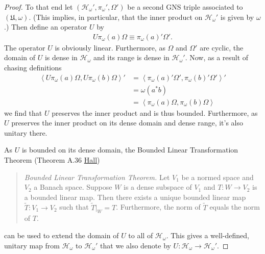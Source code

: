 \begin{proof}
To that end let $(\mathcal{H}_\omega', \pi_\omega', \Omega')$ be a second GNS triple associated to $(\mathfrak{U}, \omega)$. (This implies, in particular, that the inner product on $\mathcal{H}_\omega'$ is given by $\omega$.) Then define an operator $U$ by
\begin{align}
    U\pi_\omega(a)\Omega \equiv \pi_\omega(a)'\Omega'.
\end{align}
The operator $U$ is obviously linear. Furthermore, as $\Omega$ and $\Omega'$ are cyclic, the domain of $U$ is dense in $\mathcal{H}_\omega$ and its range is dense in $\mathcal{H}_\omega'$. Now, as a result of chasing definitions
\begin{align}
    \left< U\pi_\omega(a)\Omega, U\pi_\omega(b)\Omega \right>' &= \left<\pi_\omega(a)'\Omega', \pi_\omega(b)'\Omega'\right>' \\
                                                               &= \omega(a^*b) \\
                                                               &= \left<\pi_\omega(a)\Omega, \pi_\omega(b)\Omega\right>
\end{align}
we find that $U$ preserves the inner product and is thus bounded. Furthermore, as $U$ preserves the inner product on its dense domain and dense range, it's also unitary there.

As $U$ is bounded on its dense domain, the Bounded Linear Transformation Theorem (Theorem A.36 \href{https://doi.org/10.1007/978-1-4614-7116-5}{Hall})

\begin{quote}
    \textit{Bounded Linear Transformation Theorem.} Let $V_1$ be a normed space and $V_2$ a Banach space. Suppose $W$ is a dense subspace of $V_1$ and $T: W \rightarrow V_2$ is a bounded linear map. Then there exists a unique bounded linear map $\widetilde{T}: V_1 \rightarrow V_2$ such that $\widetilde{T}|_W = T$. Furthermore, the norm of $\widetilde{T}$ equals the norm of $T$.
\end{quote}

\noindent can be used to extend the domain of $U$ to all of $\mathcal{H}_\omega$. This gives a well-defined, unitary map from $\mathcal{H}_\omega$ to $\mathcal{H}_\omega'$ that we also denote by $U : \mathcal{H}_\omega \rightarrow \mathcal{H}_\omega'$.


\end{proof}
